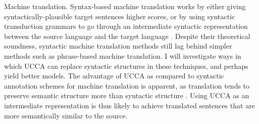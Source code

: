 \documentclass[12pt]{article}
\makeatletter
\renewcommand{\paragraph}{
  \@startsection{paragraph}{4}
  {\z@}{.3ex \@plus .3ex \@minus .2ex}{-1em}
  {\normalfont\normalsize\bfseries}
}
\makeatother
\begin{document}
\paragraph{Machine translation.}
Syntax-based machine translation works by either giving syntactically-plausible target sentences higher scores,
or by using syntactic transduction grammars to go through an intermediate syntactic representation between
the source language and the target language \cite{nadejde2013edinburgh}.
Despite their theoretical soundness, syntactic machine translation methods still lag behind simpler methods
such as phrase-based machine translation.
I will investigate ways in which UCCA can replace syntactic structures in these techniques, and perhaps
yield better models.
The advantage of UCCA as compared to syntactic annotation schemes for machine translation is apparent,
as translation tends to preserve semantic structure more than syntactic structure \cite{sulem2015conceptual}.
Using UCCA as an intermediate representation is thus likely to achieve translated sentences that are more
semantically similar to the source.





\end{document}

